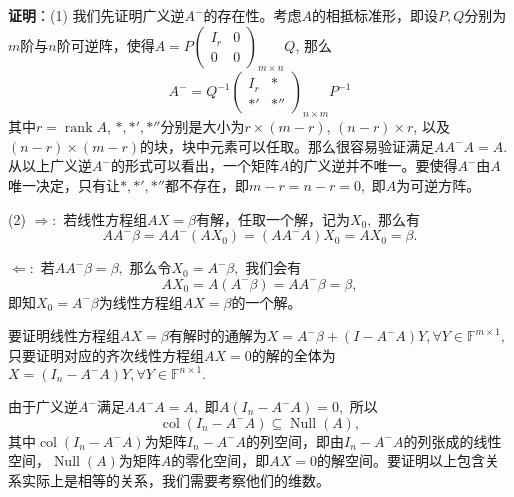 \ifIncludeAnswer

\newpageorvspace

\textbf{证明}：(1) 我们先证明广义逆$A^-$的存在性。考虑$A$的相抵标准形，即设$P,Q$分别为$m$阶与$n$阶可逆阵，使得$A = P \begin{pmatrix} I_r & 0 \\ 0 & 0 \end{pmatrix}_{m\times n}\!\!\!\!\!\!\!\!\!\!\! Q$, 那么
$$A^- = Q^{-1} \begin{pmatrix} I_r & * \\ *' & *'' \end{pmatrix}_{n\times m}\!\!\!\!\!\!\!\!\!\!\! P^{-1}$$
其中$r = \operatorname{rank} A$, $*,*',*''$分别是大小为$r \times (m-r)$, $(n-r) \times r$, 以及$(n-r) \times (m-r)$的块，块中元素可以任取。那么很容易验证满足$AA^-A = A.$ 从以上广义逆$A^-$的形式可以看出，一个矩阵$A$的广义逆并不唯一。要使得$A^-$由$A$唯一决定，只有让$*,*',*''$都不存在，即$m - r = n - r = 0,$ 即$A$为可逆方阵。

(2) $\Rightarrow:$ 若线性方程组$AX = \beta$有解，任取一个解，记为$X_0,$ 那么有
$$AA^-\beta = AA^-(AX_0) = (AA^-A)X_0 = AX_0 = \beta.$$

$\Leftarrow:$ 若$AA^-\beta = \beta,$ 那么令$X_0 = A^-\beta,$ 我们会有
$$AX_0 = A(A^-\beta) = AA^-\beta = \beta,$$
即知$X_0 = A^-\beta$为线性方程组$AX = \beta$的一个解。

要证明线性方程组$AX = \beta$有解时的通解为$X = A^-\beta + (I - A^-A)Y, \forall Y \in \mathbb{F}^{m\times 1},$ 只要证明对应的齐次线性方程组$AX = 0$的解的全体为$X = (I_n - A^-A)Y, \forall Y \in \mathbb{F}^{n\times 1}.$

由于广义逆$A^-$满足$AA^-A = A,$ 即$A(I_n - A^-A) = 0,$ 所以
$$\operatorname{col}(I_n - A^-A) \subseteq \operatorname{Null} (A),$$
其中$\operatorname{col}(I_n - A^-A)$为矩阵$I_n - A^-A$的列空间，即由$I_n - A^-A$的列张成的线性空间，$\operatorname{Null} (A)$为矩阵$A$的零化空间，即$AX = 0$的解空间。要证明以上包含关系实际上是相等的关系，我们需要考察他们的维数。


